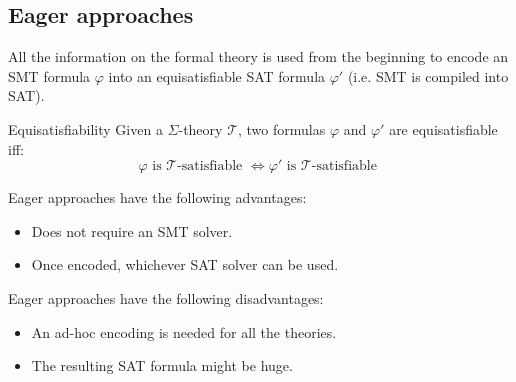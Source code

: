 \subsection{Eager approaches}

All the information on the formal theory is used from the beginning to encode an SMT formula $\varphi$ into an equisatisfiable SAT formula $\varphi'$
(i.e. SMT is compiled into SAT).

\begin{descriptionlist}
    \item[Equisatisfiability] 
        Given a $\Sigma$-theory $\mathcal{T}$, two formulas $\varphi$ and $\varphi'$ are equisatisfiable iff:
        \[ \varphi \text{ is $\mathcal{T}$-satisfiable } \iff \varphi' \text{ is $\mathcal{T}$-satisfiable } \]
\end{descriptionlist}

Eager approaches have the following advantages:
\begin{itemize}
    \item Does not require an SMT solver.
    \item Once encoded, whichever SAT solver can be used.
\end{itemize}

Eager approaches have the following disadvantages:
\begin{itemize}
    \item An ad-hoc encoding is needed for all the theories.
    \item The resulting SAT formula might be huge.
\end{itemize}


